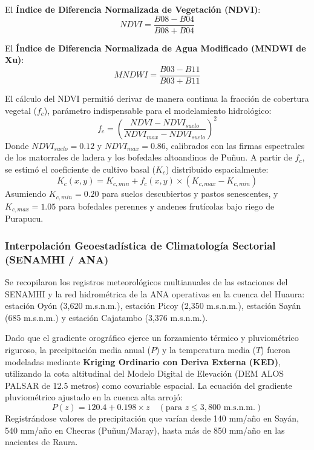 \documentclass[11pt,a4paper]{article}
\begin{document}
El \textbf{Índice de Diferencia Normalizada de Vegetación (NDVI)}:
\begin{equation}
NDVI = \frac{B08 - B04}{B08 + B04}
\end{equation}

El \textbf{Índice de Diferencia Normalizada de Agua Modificado (MNDWI de Xu)}:
\begin{equation}
MNDWI = \frac{B03 - B11}{B03 + B11}
\end{equation}

El cálculo del NDVI permitió derivar de manera continua la fracción de cobertura vegetal ($f_c$), parámetro indispensable para el modelamiento hidrológico:
\begin{equation}
f_c = \left( \frac{NDVI - NDVI_{suelo}}{NDVI_{max} - NDVI_{suelo}} \right)^2
\end{equation}
Donde $NDVI_{suelo} = 0.12$ y $NDVI_{max} = 0.86$, calibrados con las firmas espectrales de los matorrales de ladera y los bofedales altoandinos de Puñun. A partir de $f_c$, se estimó el coeficiente de cultivo basal ($K_c$) distribuido espacialmente:
\begin{equation}
K_c(x,y) = K_{c,min} + f_c(x,y) \times (K_{c,max} - K_{c,min})
\end{equation}
Asumiendo $K_{c,min} = 0.20$ para suelos descubiertos y pastos senescentes, y $K_{c,max} = 1.05$ para bofedales perennes y andenes frutícolas bajo riego de Purapucu.

\subsubsection{Interpolación Geoestadística de Climatología Sectorial (SENAMHI / ANA)}
Se recopilaron los registros meteorológicos multianuales de las estaciones del SENAMHI y la red hidrométrica de la ANA operativas en la cuenca del Huaura: estación Oyón (3,620 m.s.n.m.), estación Picoy (2,350 m.s.n.m.), estación Sayán (685 m.s.n.m.) y estación Cajatambo (3,376 m.s.n.m.). 

Dado que el gradiente orográfico ejerce un forzamiento térmico y pluviométrico riguroso, la precipitación media anual ($P$) y la temperatura media ($T$) fueron modeladas mediante \textbf{Kriging Ordinario con Deriva Externa (KED)}, utilizando la cota altitudinal del Modelo Digital de Elevación (DEM ALOS PALSAR de 12.5 metros) como covariable espacial. La ecuación del gradiente pluviométrico ajustado en la cuenca alta arrojó:
\begin{equation}
P(z) = 120.4 + 0.198 \times z \quad (\text{para } z \le 3,800\text{ m.s.n.m.})
\end{equation}
Registrándose valores de precipitación que varían desde 140 mm/año en Sayán, 540 mm/año en Checras (Puñun/Maray), hasta más de 850 mm/año en las nacientes de Raura.
\end{document}
